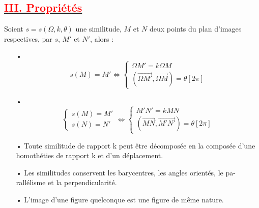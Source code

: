 \documentclass[12pt]{article}
\begin{document}
\subsection*{\underline{\textbf{\textcolor{red}{III. Propriétés}}}}
Soient $s = s{(\Omega,k,\theta)}$ une similitude, $M$ et $N$ deux points du plan d'images respectives, par $s$, $M'$ et $N'$, alors :
\begin{itemize}
\item[•]
\[
s(M)=M'\Leftrightarrow \begin{cases}
    \Omega M' = k\Omega M \\
    (\overrightarrow{\Omega M'},\overrightarrow{\Omega M})= \theta[2\pi]
\end{cases}
\]
\item[•]
\[
\begin{cases}
    s(M) = M' \\
    s(N) = N'
\end{cases}
\Leftrightarrow 
\begin{cases}
   M'N'=kMN \\
   (\overrightarrow{MN},\overrightarrow{M'N'})=\theta[2\pi]
\end{cases}\]
\item[•] Toute similitude de rapport k peut être décomposée en la composée
d’une homothéties de rapport k et d’un déplacement.
\item[•] Les similitudes conservent les barycentres, les angles orientés, le pa-
rallélisme et la perpendicularité.
\item[•] L’image d’une figure quelconque est une figure de même nature.
\end{itemize}
\end{document}
